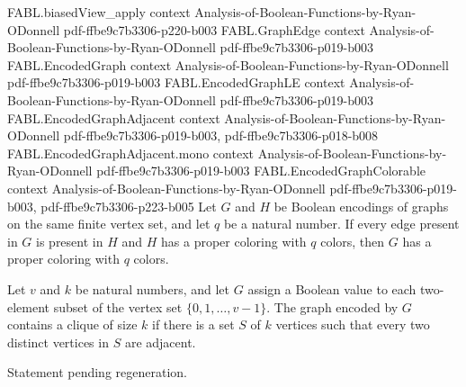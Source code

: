 \begin{theorem}
  {FABL.biasedView_apply}
  {context}
  {Analysis-of-Boolean-Functions-by-Ryan-ODonnell}
  {pdf-ffbe9c7b3306-p220-b003}
\proofstep
  {FABL.GraphEdge}
  {context}
  {Analysis-of-Boolean-Functions-by-Ryan-ODonnell}
  {pdf-ffbe9c7b3306-p019-b003}
\proofstep
  {FABL.EncodedGraph}
  {context}
  {Analysis-of-Boolean-Functions-by-Ryan-ODonnell}
  {pdf-ffbe9c7b3306-p019-b003}
\proofstep
  {FABL.EncodedGraphLE}
  {context}
  {Analysis-of-Boolean-Functions-by-Ryan-ODonnell}
  {pdf-ffbe9c7b3306-p019-b003}
\proofstep
  {FABL.EncodedGraphAdjacent}
  {context}
  {Analysis-of-Boolean-Functions-by-Ryan-ODonnell}
  {pdf-ffbe9c7b3306-p019-b003,
    pdf-ffbe9c7b3306-p018-b008}
\proofstep
  {FABL.EncodedGraphAdjacent.mono}
  {context}
  {Analysis-of-Boolean-Functions-by-Ryan-ODonnell}
  {pdf-ffbe9c7b3306-p019-b003}
\proofstep
  {FABL.EncodedGraphColorable}
  {context}
  {Analysis-of-Boolean-Functions-by-Ryan-ODonnell}
  {pdf-ffbe9c7b3306-p019-b003,
    pdf-ffbe9c7b3306-p223-b005}
Let $G$ and $H$ be Boolean encodings of graphs on the same finite vertex set, and let
$q$ be a natural number. If every edge present in $G$ is present in $H$ and $H$ has a
proper coloring with $q$ colors, then $G$ has a proper coloring with $q$ colors.
\end{theorem}

\begin{definition}
\label{FABL.EncodedGraphContainsClique}
\leanok
{}
Let $v$ and $k$ be natural numbers, and let $G$ assign a Boolean value to each
two-element subset of the vertex set $\{0,1,\ldots,v-1\}$. The graph encoded by $G$
contains a clique of size $k$ if there is a set $S$ of $k$ vertices such that every two
distinct vertices in $S$ are adjacent.
\end{definition}

\begin{theorem}
\label{FABL.encodedGraphContainsClique_permute_iff}
\leanok
{}
Statement pending regeneration.
\end{theorem}

